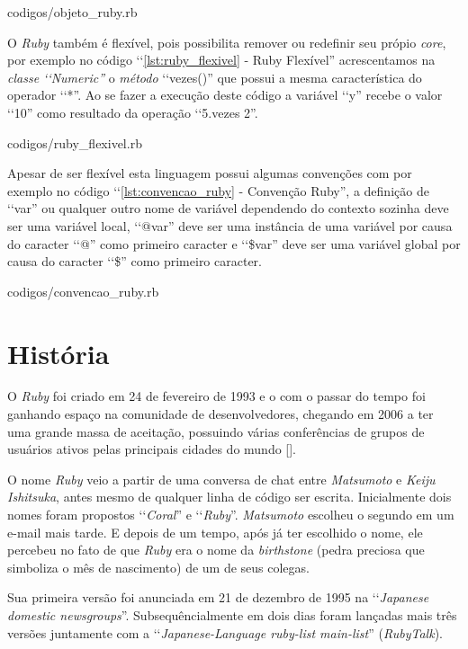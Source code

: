 
{codigos/objeto_ruby.rb}

O \emph{Ruby} também é flexível, pois possibilita remover ou redefinir seu própio \emph{core}, por
exemplo no código ‘‘\ref{lst:ruby_flexivel} - Ruby Flexível'' acrescentamos na \emph{classe ‘‘Numeric''}
o \emph{método} ‘‘vezes()'' que possui a mesma característica do operador ‘‘*''. Ao se fazer a execução
deste código a variável ‘‘y'' recebe o valor ‘‘10'' como resultado da operação ‘‘5.vezes 2''.


{codigos/ruby_flexivel.rb}

Apesar de ser flexível esta linguagem possui algumas convenções com por exemplo no código
‘‘\ref{lst:convencao_ruby} - Convenção Ruby'', a definição de ‘‘var'' ou qualquer outro nome de
variável dependendo do contexto sozinha deve ser uma variável local, ‘‘@var'' deve ser uma instância
de uma variável por causa do caracter ‘‘@'' como primeiro caracter e ‘‘\$var'' deve ser uma variável global
por causa do caracter ‘‘\$'' como primeiro caracter.


{codigos/convencao_ruby.rb}

\section{História}
\label{história_ruby}

O \emph{Ruby} foi criado em 24 de fevereiro de 1993 e o com o passar do tempo foi ganhando espaço na
comunidade de desenvolvedores, chegando em 2006 a ter uma grande massa de aceitação, possuindo várias
conferências de grupos de usuários ativos pelas principais cidades do mundo [].

O nome \emph{Ruby} veio a partir de uma conversa de chat entre \emph{Matsumoto} e \emph{Keiju Ishitsuka},
antes mesmo de qualquer linha de código ser escrita. Inicialmente dois nomes foram propostos ‘‘\emph{Coral}''
e ‘‘\emph{Ruby}''. \emph{Matsumoto} escolheu o segundo em um e-mail mais tarde. E depois de um tempo, após
já ter escolhido o nome, ele percebeu no fato de que \emph{Ruby} era o nome da \emph{birthstone} (pedra
preciosa que simboliza o mês de nascimento) de um de seus colegas.

Sua primeira versão foi anunciada em 21 de dezembro de 1995 na ‘‘\emph{Japanese domestic newsgroups}''.
Subsequêncialmente em dois dias foram lançadas mais três versões juntamente com a
‘‘\emph{Japanese-Language ruby-list main-list}'' (\emph{RubyTalk}).


